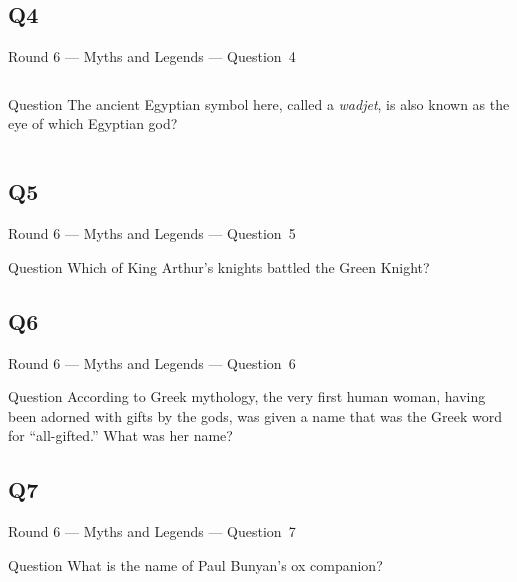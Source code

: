 \documentclass[11pt]{beamer}
\begin{document}
\subsection*{Q4}
\begin{frame}[t]{Round 6 --- Myths and Legends --- \mbox{Question 4}}
\vspace{-0.5em}
\begin{columns}[T,totalwidth=\linewidth]
\begin{column}{0.32\linewidth}
\begin{block}{Question}
The ancient Egyptian symbol here, called a \emph{wadjet}, is also known as the eye of which Egyptian god?
\end{block}
\end{column}
\begin{column}{0.65\linewidth}
\begin{center}
\texttt{[image: \{Images/wadget]}.png}
\end{center}
\end{column}
\end{columns}
\end{frame}
\subsection*{Q5}
\begin{frame}[t]{Round 6 --- Myths and Legends --- \mbox{Question 5}}
\vspace{-0.5em}
\begin{block}{Question}
Which of King Arthur's knights battled the Green Knight?
\end{block}
\end{frame}
\subsection*{Q6}
\begin{frame}[t]{Round 6 --- Myths and Legends --- \mbox{Question 6}}
\vspace{-0.5em}
\begin{block}{Question}
According to Greek mythology, the very first human woman, having been adorned with gifts by the gods, was given a name that was the Greek word for ``all-gifted.'' What was her name?
\end{block}
\end{frame}
\subsection*{Q7}
\begin{frame}[t]{Round 6 --- Myths and Legends --- \mbox{Question 7}}
\vspace{-0.5em}
\begin{block}{Question}
What is the name of Paul Bunyan's ox companion?
\end{block}
\end{frame}
\end{document}
